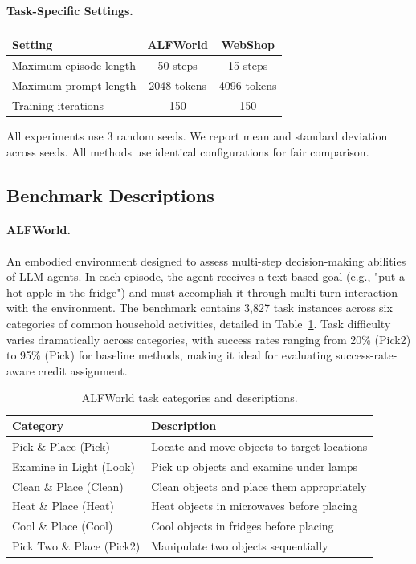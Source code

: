 \documentclass[11pt]{article}
\begin{document}
\paragraph{Task-Specific Settings.}
\begin{table}[h]
\centering
\small
\begin{tabular}{lcc}
\toprule
\textbf{Setting} & \textbf{ALFWorld} & \textbf{WebShop} \\
\midrule
Maximum episode length & 50 steps & 15 steps \\
Maximum prompt length & 2048 tokens & 4096 tokens \\
Training iterations & 150 & 150 \\
\bottomrule
\end{tabular}
\end{table}

All experiments use 3 random seeds. We report mean and standard deviation 
across seeds. All methods use identical configurations for fair comparison.

\subsection{Benchmark Descriptions}
\label{sec:appendix_benchmarks}

\paragraph{ALFWorld.}
An embodied environment designed to assess multi-step decision-making abilities of LLM agents. In each episode, the agent receives a text-based goal (e.g., "put a hot apple in the fridge") and must accomplish it through multi-turn 
interaction with the environment. The benchmark contains 3,827 task instances across six categories of common 
household activities, detailed in Table~\ref{tab:alfworld_categories}. Task difficulty varies dramatically across categories, with success rates ranging from 20\% (Pick2) to 95\% (Pick) for baseline methods, making it ideal for evaluating success-rate-aware credit assignment.

\begin{table}[t]
\centering
\small
\begin{tabular}{ll}
\toprule
\textbf{Category} & \textbf{Description} \\
\midrule
Pick \& Place (Pick) & Locate and move objects to target locations \\
Examine in Light (Look) & Pick up objects and examine under lamps \\
Clean \& Place (Clean) & Clean objects and place them appropriately \\
Heat \& Place (Heat) & Heat objects in microwaves before placing \\
Cool \& Place (Cool) & Cool objects in fridges before placing \\
Pick Two \& Place (Pick2) & Manipulate two objects sequentially \\
\bottomrule
\end{tabular}
\caption{ALFWorld task categories and descriptions.}
\label{tab:alfworld_categories}
\end{table}
\end{document}
